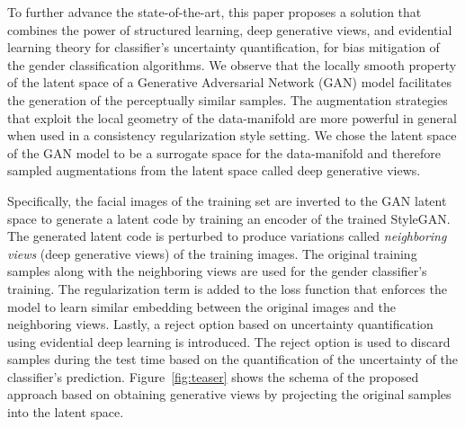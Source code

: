 \documentclass[runningheads]{llncs}
\begin{document}
\begin{comment}
They offer a trade-off between fairness and classification task
In this context, two lines of research are being pursued (a) examining the bias of existing gender classification algorithms across gender-race groups and (2) developing solutions in the form of fairness-aware loss functions, and unlearning the dependency of the model on sensitive
attributes and disentangling the features related to sensitive attributes from those for the main classification task.

Overall, these strategies for bias mitigation of gender classification algorithms could be categorized as (a) data level, and (b) algorithmic level. At the data level, bias is mitigated by using gender and race-balanced datasets, and using generative approaches to synthesize images of the under-represented class for bias mitigation. At the algorithmic level, fairness-aware loss functions, and techniques for disentangling race-related features from the classification layers of the model are introduced.
\end{comment}

To further advance the state-of-the-art, this paper proposes a solution that combines the power of structured learning, deep generative views, and evidential learning theory for classifier's uncertainty quantification, for bias mitigation of the gender classification algorithms. We observe that the locally smooth property of the latent space of a Generative Adversarial Network (GAN) model facilitates the generation of the perceptually similar samples. The augmentation strategies that exploit the local geometry of the data-manifold are more powerful in general when used in a consistency regularization style setting. We chose the latent space of the GAN model to be a surrogate space for the data-manifold and therefore sampled augmentations from the latent space called deep generative views. 

Specifically, the facial images of the training set are inverted to the GAN latent space to generate a latent code by training an encoder of the trained StyleGAN. The generated latent code is perturbed to produce variations called \emph{neighboring views} (deep generative views) of the training images. The original training samples along with the neighboring views are used for the gender classifier's training. The regularization term is added to the loss function that enforces the model to learn similar embedding between the original images and the neighboring views. Lastly, a reject option based on uncertainty quantification using evidential deep learning is introduced. The reject option is used to discard samples during the test time based on the quantification of the uncertainty of the classifier's prediction. Figure~\ref{fig:teaser} shows the schema of the proposed approach based on obtaining generative views by projecting the original samples into the latent space.
\end{document}
